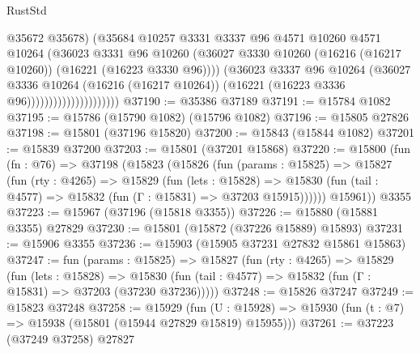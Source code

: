 \begin{lexlean}{RustStd}
\begin{coremodule}
                                      @35672
                                      @35678)
                                    (@35684
                                      @10257
                                      @3331
                                      @3337
                                      @96
                                      @4571
                                      @10260
                                      @4571
                                      @10264
                                      (@36023
                                        @3331
                                        @96
                                        @10260
                                        (@36027
                                          @3330
                                          @10260
                                          (@16216 (@16217 @10260))
                                          (@16221 (@16223 @3330 @96))))
                                      (@36023
                                        @3337
                                        @96
                                        @10264
                                        (@36027
                                          @3336
                                          @10264
                                          (@16216 (@16217 @10264))
                                          (@16221 (@16223 @3336 @96)))))))))))))))))))))
@37190 := @35386 @37189
@37191 := @15784 @1082
@37195 := @15786 (@15790 @1082) (@15796 @1082)
@37196 := @15805 @27826
@37198 := @15801 (@37196 @15820)
@37200 := @15843 (@15844 @1082)
@37201 := @15839 @37200
@37203 := @15801 (@37201 @15868)
@37220 := @15800
    (fun (fn : @76) =>
    @37198
      (@15823
        (@15826
          (fun (params : @15825) =>
          @15827
            (fun (rty : @4265) =>
            @15829
              (fun (lets : @15828) =>
              @15830 (fun (tail : @4577) => @15832 (fun (Γ : @15831) => @37203 @15915))))))
        @15961))
    @3355
@37223 := @15967 (@37196 (@15818 @3355))
@37226 := @15880 (@15881 @3355) @27829
@37230 := @15801 (@15872 (@37226 @15889) @15893)
@37231 := @15906 @3355
@37236 := @15903 (@15905 @37231 @27832 @15861 @15863)
@37247 := fun (params : @15825) =>
  @15827
    (fun (rty : @4265) =>
    @15829
      (fun (lets : @15828) =>
      @15830 (fun (tail : @4577) => @15832 (fun (Γ : @15831) => @37203 (@37230 @37236)))))
@37248 := @15826 @37247
@37249 := @15823 @37248
@37258 := @15929
    (fun (U : @15928) => @15930 (fun (t : @7) => @15938 (@15801 (@15944 @27829 @15819) @15955)))
@37261 := @37223 (@37249 @37258) @27827

\end{coremodule}
\end{lexlean}
